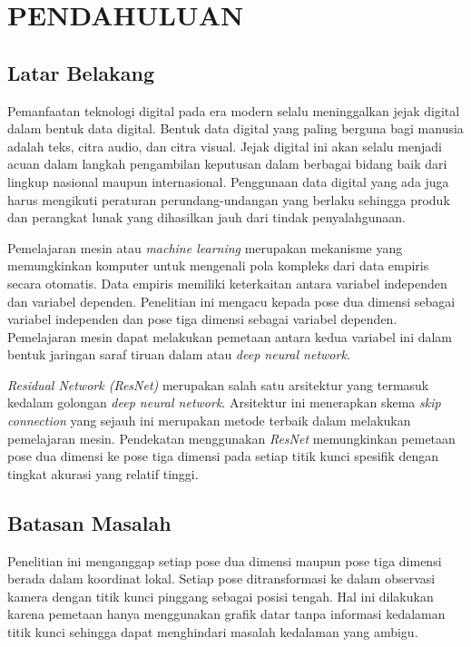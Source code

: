 
\chapter{PENDAHULUAN}
\label{cha:1-Pendahuluan}

\section{Latar Belakang}
\label{sec:1-LatarBelakang}

Pemanfaatan teknologi digital pada era modern selalu meninggalkan jejak digital dalam bentuk data
digital. Bentuk data digital yang paling berguna bagi manusia adalah teks, citra audio, dan citra
visual. Jejak digital ini akan selalu menjadi acuan dalam langkah pengambilan keputusan dalam
berbagai bidang baik dari lingkup nasional maupun internasional. Penggunaan data digital yang ada
juga harus mengikuti peraturan perundang-undangan yang berlaku sehingga produk dan perangkat lunak
yang dihasilkan jauh dari tindak penyalahgunaan.

Pemelajaran mesin atau \textit{machine learning} merupakan mekanisme yang memungkinkan komputer
untuk mengenali pola kompleks dari data empiris secara otomatis. Data empiris memiliki keterkaitan
antara variabel independen dan variabel dependen. Penelitian ini mengacu kepada pose dua dimensi
sebagai variabel independen dan pose tiga dimensi sebagai variabel dependen. Pemelajaran mesin
dapat melakukan pemetaan antara kedua variabel ini dalam bentuk jaringan saraf tiruan dalam atau
\textit{deep neural network}.

\textit{Residual Network (ResNet)} merupakan salah satu arsitektur yang termasuk kedalam golongan
\textit{deep neural network}. Arsitektur ini menerapkan skema \textit{skip connection} yang sejauh
ini merupakan metode terbaik dalam melakukan pemelajaran mesin. Pendekatan menggunakan \textit{ResNet}
memungkinkan pemetaan pose dua dimensi ke pose tiga dimensi pada setiap titik kunci spesifik dengan
tingkat akurasi yang relatif tinggi.

\section{Batasan Masalah}
\label{sec:1-BatasMasalah}

Penelitian ini menganggap setiap pose dua dimensi maupun pose tiga dimensi berada dalam koordinat
lokal. Setiap pose ditransformasi ke dalam observasi kamera dengan titik kunci pinggang
sebagai posisi tengah. Hal ini dilakukan karena pemetaan hanya menggunakan grafik datar tanpa
informasi kedalaman titik kunci sehingga dapat menghindari masalah kedalaman yang ambigu.


